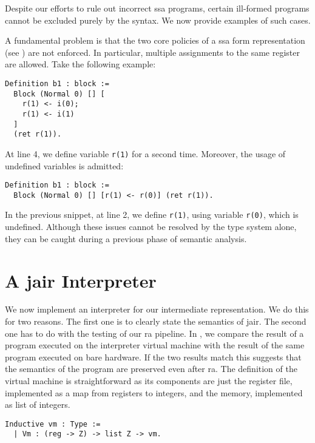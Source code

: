 Despite our efforts to rule out incorrect \gls{ssa} programs, certain ill-formed programs cannot be excluded purely by the syntax. We now provide examples of such cases.

A fundamental problem is that the two core policies of a \gls{ssa} form representation (see ) are not enforced. In particular, multiple assignments to the same register are allowed. Take the following example:

\begin{lstlisting}[style=Rocq]
Definition b1 : block :=
  Block (Normal 0) [] [
    r(1) <- i(0);
    r(1) <- i(1)
  ]
  (ret r(1)).
\end{lstlisting}

At line 4, we define variable \texttt{r(1)} for a second time.
Moreover, the usage of undefined variables is admitted:

\begin{lstlisting}[style=Rocq]
Definition b1 : block :=
  Block (Normal 0) [] [r(1) <- r(0)] (ret r(1)).
\end{lstlisting}

In the previous snippet, at line 2, we define \texttt{r(1)}, using variable \texttt{r(0)}, which is undefined.
Although these issues cannot be resolved by the type system alone, they can be caught during a previous phase of semantic analysis.

\section{A \gls{jair} Interpreter}
\label{sec:jair-vm}

We now implement an interpreter for our intermediate representation. We do this for two reasons. The first one is to clearly state the semantics of \gls{jair}. The second one has to do with the testing of our \gls{ra} pipeline. In , we compare the result of a program executed on the interpreter virtual machine with the result of the same program executed on bare hardware. If the two results match this suggests that the semantics of the program are preserved even after \gls{ra}.
The definition of the virtual machine is straightforward as its components are just the register file, implemented as a map from registers to integers, and the memory, implemented as list of integers.

\begin{lstlisting}[style=Rocq]
Inductive vm : Type :=
  | Vm : (reg -> Z) -> list Z -> vm.
\end{lstlisting}

